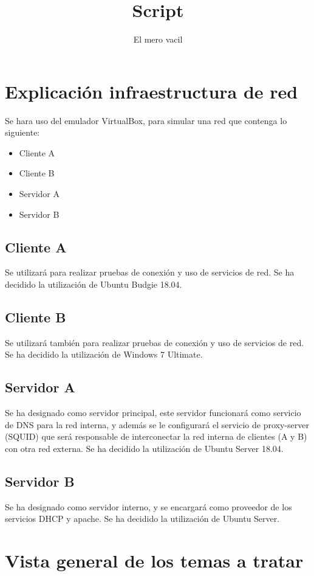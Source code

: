 \documentclass[12pt]{report}
\title{Script}
\author{El mero vacil}
\begin{document}
        \maketitle

        \newpage
        \section*{Explicación infraestructura de red}
        Se hara uso del emulador VirtualBox, para simular una red que contenga lo siguiente:
        \begin{itemize}
            \item Cliente A
            \item Cliente B
            \item Servidor A
            \item Servidor B
        \end{itemize}
        \subsection*{Cliente A}
        Se utilizará para realizar pruebas de conexión y uso de servicios de red. Se ha decidido la utilización de Ubuntu Budgie 18.04.
        \subsection*{Cliente B}
        Se utilizará también para realizar pruebas de conexión y uso de servicios de red. Se ha decidido la utilización de Windows 7 Ultimate.
        \subsection*{Servidor A}
        Se ha designado como servidor principal, este servidor funcionará como servicio de DNS para la red interna, y además se le configurará el servicio de proxy-server (SQUID) que será responsable de interconectar la red interna de clientes (A y B) con otra red externa. 
        Se ha decidido la utilización de Ubuntu Server 18.04.
        \subsection*{Servidor B}
        Se ha designado como servidor interno, y se encargará como proveedor de los servicios DHCP y apache. Se ha decidido la utilización de Ubuntu Server.
        \section*{Vista general de los temas a tratar}
\end{document}
